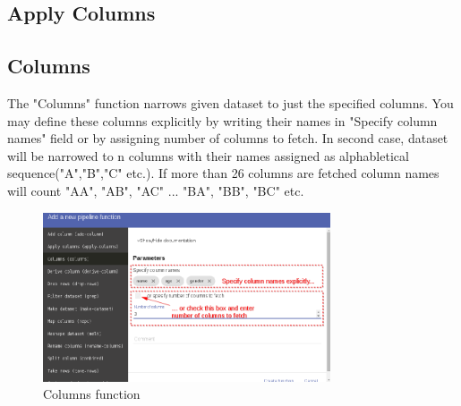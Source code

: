 \documentclass[USenglish]{article}
\begin{document}
\subsection{Apply Columns}
\subsection{Columns}
The "Columns" function narrows given dataset to just the specified columns. You may define these columns explicitly by writing their names in "Specify column names" field or by assigning  number of columns to fetch. In second case, dataset will be narrowed to n columns with their names assigned as alphabletical sequence("A","B","C" etc.). If more than 26 columns are fetched column names will count "AA", "AB", "AC" ... "BA", "BB", "BC" etc.

 \begin{center}
\begin{figure}[!htbp]
\centering
\includegraphics[height=5cm] {columns.png}
 \caption{Columns function \label{meta}}
\end{figure}
\end{center}
\end{document}

